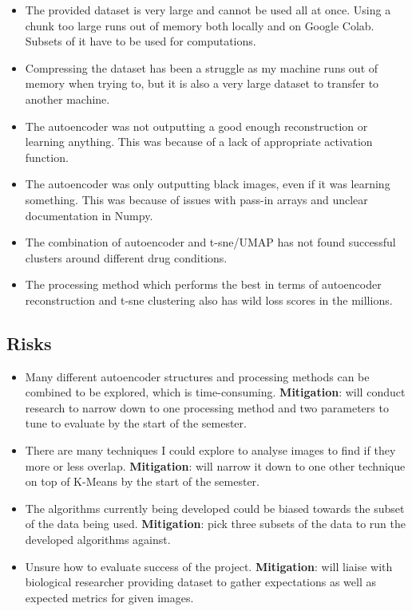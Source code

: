 \documentclass[11pt]{article}
\begin{document}
\begin{itemize}
    \tightlist
\item The provided dataset is very large and cannot be used all at once. Using a chunk too large runs out of memory both locally and on Google Colab. Subsets of it have to be used for computations.
\item Compressing the dataset has been a struggle as my machine runs out of memory when trying to, but it is also a very large dataset to transfer to another machine.
\item The autoencoder was not outputting a good enough reconstruction or learning anything. This was because of a lack of appropriate activation function.
\item The autoencoder was only outputting black images, even if it was learning something. This was because of issues with pass-in arrays and unclear documentation in Numpy.
\item The combination of autoencoder and t-sne/UMAP has not found successful clusters around different drug conditions.
\item The processing method which performs the best in terms of autoencoder reconstruction and t-sne clustering also has wild loss scores in the millions.
\end{itemize}

\subsection{Risks}\label{risks}

\begin{itemize}
    \tightlist
\item Many different autoencoder structures and processing methods can be combined to be explored, which is time-consuming. \textbf{Mitigation}: will conduct research to narrow
down to one processing method and two parameters to tune to evaluate by the start of the semester.
\item There are many techniques I could explore to analyse images to find if they more or less overlap. \textbf{Mitigation}: will narrow it down to one other technique on top of K-Means by the start of the semester.
\item The algorithms currently being developed could be biased towards the subset of the data being used. \textbf{Mitigation}: pick three subsets of the data to run the developed algorithms against.
\item Unsure how to evaluate success of the project. \textbf{Mitigation}: will liaise with biological researcher providing dataset to gather expectations as well as expected metrics for given images.
\end{itemize}
\end{document}
